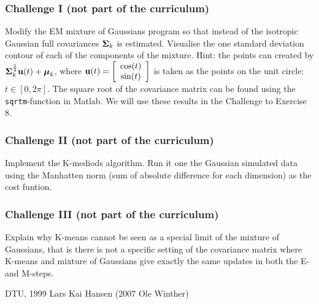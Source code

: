 \documentclass[times,12pt]{article}    %
\def\mub{\text{\boldmath $\mu$}}
\def\Sigb{\text{\boldmath $\Sigma$}}
\begin{document}
\subsubsection*{Challenge I (not part of the curriculum)}

Modify the EM mixture of Gaussians program so that instead of the isotropic Gaussian full covariances $\Sigb_k$ is estimated. Visualise the one standard deviation contour of each of the components of the mixture. Hint: the points can created by $\Sigb_k^{\frac{1}{2}} {\bf u}(t)+\mub_k$, where ${\bf u}(t)=\left[ \begin{array}{c} \cos(t) \\ \sin(t) \end{array} \right]$ is taken as the points on the unit circle: $t \in [0,2\pi]$. The square root of the covariance  matrix can be found using the {\tt sqrtm}-function in Matlab. We will use these results in the Challenge to Exercise 8.

\subsubsection*{Challenge II (not part of the curriculum)}

Implement the K-mediods algorithm. Run it one the Gaussian simulated data using the Manhatten norm (sum of absolute difference for each dimension) as the cost funtion.

\subsubsection*{Challenge III (not part of the curriculum)}

Explain why K-means cannot be seen as a special limit of the mixture of Gaussians, that is there is not a specific setting of the covariance matrix where K-means and mixture of Gaussians give exactly the same updates in both the E- and M-steps.


\vspace{1cm} DTU, 1999 Lars Kai Hansen (2007 Ole Winther)
\end{document}
